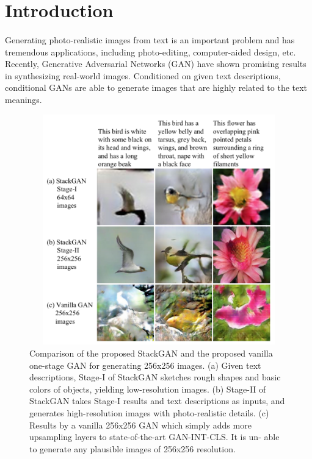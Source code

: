 \documentclass[a4paper,12pt,oneside]{article}
\begin{document}
\setlength{\baselineskip}{1.0\baselineskip}
\newpage
\begin{center}
\tableofcontents
\end{center}
\newpage
\thispagestyle{plain}
\begin{center}
\vspace{5mm}
\listoffigures
\end{center}

\newpage
\rfoot{\thepage}



\rfoot{\thepage}
\section{Introduction}
\paragraph{}
Generating photo-realistic images from text is an important problem and has tremendous applications, including photo-editing, computer-aided design, etc. Recently, Generative Adversarial Networks (GAN) have shown promising results in synthesizing real-world images. Conditioned on given text descriptions, conditional GANs are able to generate images that are highly related to the text meanings. 

\begin{figure}[H]
\centering
\includegraphics[height=10cm,width=15cm]{Figure1.png}
\caption[Comparison of the proposed StackGAN and the proposed vanilla one-stage GAN for generating 256x256 images]{Comparison of the proposed StackGAN and the proposed vanilla one-stage GAN for generating 256x256 images. (a) Given text descriptions, Stage-I of StackGAN sketches rough shapes and basic colors of objects, yielding low-resolution images. (b) Stage-II of StackGAN takes Stage-I results and text descriptions as inputs, and generates high-resolution images with photo-realistic details. (c) Results by a vanilla 256x256 GAN which simply adds more upsampling layers to state-of-the-art GAN-INT-CLS. It is un- able to generate any plausible images of 256x256 resolution. }
\end{figure}
\end{document}
